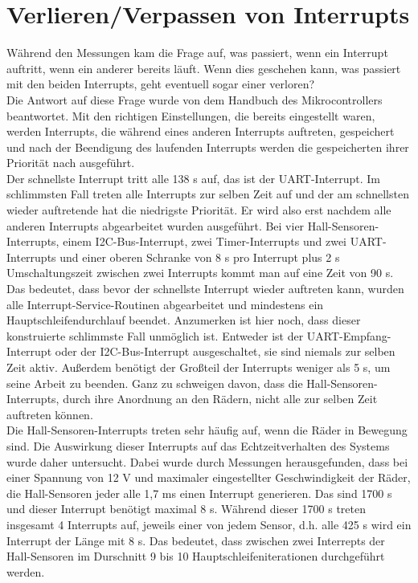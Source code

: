 \section{Verlieren/Verpassen von Interrupts}
Während den Messungen kam die Frage auf, was passiert, wenn ein Interrupt auftritt, wenn ein anderer bereits läuft.
Wenn dies geschehen kann, was passiert mit den beiden Interrupts, geht eventuell sogar einer verloren?\\
Die Antwort auf diese Frage wurde von dem Handbuch des Mikrocontrollers \cite{ATMEGA_MANUAL} beantwortet. Mit
den richtigen Einstellungen, die bereits eingestellt waren, werden Interrupts, die während eines anderen
Interrupts auftreten, gespeichert und nach der Beendigung des laufenden Interrupts werden die gespeicherten
ihrer Priorität nach ausgeführt.\\
Der schnellste Interrupt tritt alle 138 \textmu{}s auf, das ist der UART-Interrupt. Im schlimmsten Fall treten alle 
Interrupts zur selben
Zeit auf und der am schnellsten wieder auftretende hat die niedrigste Priorität. Er wird also erst nachdem alle
anderen Interrupts abgearbeitet wurden ausgeführt. Bei vier Hall-Sensoren-Interrupts, einem I2C-Bus-Interrupt,
zwei Timer-Interrupts und zwei UART-Interrupts und einer oberen Schranke von 8 \textmu{}s pro Interrupt plus
2 \textmu{}s Umschaltungszeit zwischen zwei Interrupts kommt man auf eine Zeit von 90 \textmu{}s.
Das bedeutet, dass bevor der schnellste Interrupt wieder auftreten kann, wurden alle Interrupt-Service-Routinen
abgearbeitet und mindestens ein Hauptschleifendurchlauf beendet. Anzumerken ist hier noch, dass dieser konstruierte
schlimmste Fall unmöglich ist. Entweder ist der UART-Empfang-Interrupt oder der I2C-Bus-Interrupt ausgeschaltet, sie
sind niemals zur selben Zeit aktiv. Außerdem benötigt der Großteil der Interrupts weniger als 5 \textmu{}s, um
seine Arbeit zu beenden. Ganz zu schweigen davon, dass die Hall-Sensoren-Interrupts, durch ihre Anordnung an den
Rädern, nicht alle zur selben Zeit auftreten können.\\
Die Hall-Sensoren-Interrupts treten sehr häufig auf, wenn die Räder in
Bewegung sind. Die Auswirkung dieser Interrupts auf das Echtzeitverhalten des Systems wurde daher
untersucht. Dabei wurde durch Messungen herausgefunden, dass bei einer Spannung von 12 V und maximaler
eingestellter Geschwindigkeit der Räder, die Hall-Sensoren jeder alle 1,7 ms einen Interrupt generieren.
Das sind 1700 \textmu{}s und dieser Interrupt benötigt maximal 8 \textmu{}s. Während dieser 1700 \textmu{}s
treten insgesamt 4 Interrupts auf, jeweils einer von jedem Sensor, d.h. alle 425 \textmu{}s wird ein Interrupt der Länge
mit 8 \textmu{}s. Das bedeutet, dass zwischen zwei Interrepts der Hall-Sensoren im Durschnitt 9 bis 10 Hauptschleifeniterationen
durchgeführt werden.

